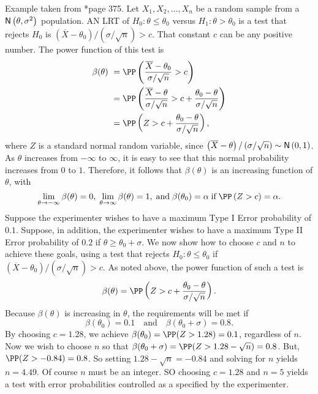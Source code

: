 \begin{exam} \label{exam: normal_pow_func}
    Example taken from \cite{CasellaGeorge2001SI}*{page 375}. Let $X_1, X_2 , \ldots , X_n$ be a random sample from a ${\sf N} \left( \theta , \sigma^2 \right)$ population. AN LRT of $H_0 : \theta \leq \theta_0$ versus $H_1 : \theta > \theta_0$ is a test that rejects $H_0$ is $\left( \overline{X} - \theta_0 \right) / \left( \sigma / \sqrt{n} \right) > c$. That constant $c$ can be any positive number. The power function of this test is
    \begin{align*}
        \beta (\theta) \
         & = \PP \left( \frac{\overline{X} - \theta_0}{\sigma / \sqrt{n}} > c \right)                                             \\
         & = \PP \left( \frac{\overline{X} - \theta}{\sigma / \sqrt{n}} > c + \frac{\theta_0 - \theta}{\sigma / \sqrt{n}} \right) \\
         & = \PP \left( Z > c + \frac{\theta_0 - \theta}{\sigma / \sqrt{n}} \right),
    \end{align*}
    where $Z$ is a standard normal random variable, since $\left( \overline{X} - \theta \right) / \left( \sigma / \sqrt{n} \right) \sim {\sf N} \left( 0,1 \right)$. As $\theta$ increases from $-\infty$ to $\infty$, it is easy to see that this normal probability increases from $0$ to $1$. Therefore, it follows that $\beta (\theta)$ is an increasing function of $\theta$, with
    \begin{equation*}
        \lim_{\theta \to - \infty} \beta (\theta) =0 , \; \lim_{\theta \to \infty} \beta (\theta) = 1 , \; \text{and} \; \beta (\theta_0) = \alpha \; \text{if} \; \PP \left( Z > c \right) = \alpha.
    \end{equation*}
    Suppose the experimenter wishes to have a maximum Type I Error probability of $0.1$. Suppose, in addition, the experimenter wishes to have a maximum Type II Error probability of $0.2$ if $\theta \geq \theta_0 + \sigma$. We now show how to choose $c$ and $n$ to achieve these goals, using a test that rejects $H_0 : \theta \leq \theta_0$ if $\left( \overline{X} - \theta_0 \right) / \left( \sigma / \sqrt{n} \right) > c$. As noted above, the power function of such a test is
    \begin{equation*}
        \beta (\theta) = \PP \left( Z > c + \frac{\theta_0 - \theta}{\sigma / \sqrt{n}} \right).
    \end{equation*}
    Because $\beta (\theta)$ is increasing in $\theta$, the requirements will be met if
    \begin{equation*}
        \beta (\theta_0) = 0.1 \quad \text{and} \quad \beta (\theta_0 + \sigma) = 0.8.
    \end{equation*}
    By choosing $c=1.28$, we achieve $\beta (\theta_0) = \PP (Z > 1.28) = 0.1$, regardless of $n$. Now we wish to choose $n$ so that $\beta (\theta_0 + \sigma) = \PP (Z > 1.28 - \sqrt{n}) = 0.8$. But, $\PP (Z>-0.84) = 0.8$. So setting $1.28 - \sqrt{n} = -0.84$ and solving for $n$ yields $n = 4.49$. Of course $n$ must be an integer. SO choosing $c=1.28$ and $n=5$ yields a test with error probabilities controlled as a specified by the experimenter.
\end{exam}